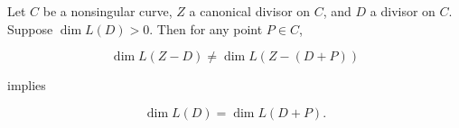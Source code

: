 Let $C$ be a nonsingular curve, $Z$ a canonical divisor on $C$, and $D$ a divisor on $C$. Suppose $\dim L(D) > 0$. Then for any point $P \in C$,

$$\dim L(Z - D) \neq \dim L(Z - (D + P))$$

implies

$$\dim L(D) = \dim L(D + P).$$
